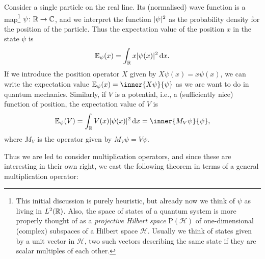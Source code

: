 \documentclass[article, a4paper, 11pt, oneside]{memoir}
\makeatletter
\numberwithin{equation}{chapter}
\newcommand{\calH}{\mathcal{H}}
\newcommand{\dom}{\mathcal{D}}
\theoremstyle{myexample}
\theoremstyle{myexample}
\theoremstyle{myexamplebreak}
\theoremstyle{myexamplebreak}
\theoremstyle{nonumberplain}
\newtheorem{proof}{\protect\@proof}
\theoremstyle{MyNonumberplain}
\newcommand{\@proof}{}
\renewcommand{\@proof}{Proof}%
\renewcommand{\@proof}{Bevis}%
\makeatother
\begin{document}
Consider a single particle on the real line. Its (normalised) wave function is a map\footnote{This initial discussion is purely heuristic, but already now we think of $\psi$ as living in $L^2(\mathbb{R})$. Also, the space of states of a quantum system is more properly thought of as a \emph{projective Hilbert space} $\mathrm{P}(\calH)$ of one-dimensional (complex) subspaces of a Hilbert space $\calH$. Usually we think of states given by a unit vector in $\calH$, two such vectors describing the same state if they are scalar multiples of each other.} $\psi \colon \mathbb{R} \to \mathbb{C}$, and we interpret the function $\lvert\psi\rvert^2$ as the probability density for the position of the particle. Thus the expectation value of the position $x$ in the state $\psi$ is
%
\begin{equation*}
    \mathbb{E}_\psi(x) = \int_{\mathbb{R}} x \lvert\psi(x)\rvert^2 \mathop{}\!\mathrm{d} x.
\end{equation*}
%
If we introduce the position operator $X$ given by $X\psi(x) = x \psi(x)$, we can write the expectation value $\expectation_\psi(x) = \inner{X\psi}{\psi}$ as we are want to do in quantum mechanics. Similarly, if $V$ is a potential, i.e., a (sufficiently nice) function of position, the expectation value of $V$ is
%
\begin{equation*}
    \expectation_\psi(V)
        = \int_\setR V(x) \abs{\psi(x)}^2 \dif x
        = \inner{M_V \psi}{\psi},
\end{equation*}
%
where $M_V$ is the operator given by $M_V \psi = V\psi$.

Thus we are led to consider multiplication operators, and since these are interesting in their own right, we cast the following theorem in terms of a general multiplication operator:


    
\end{document}

